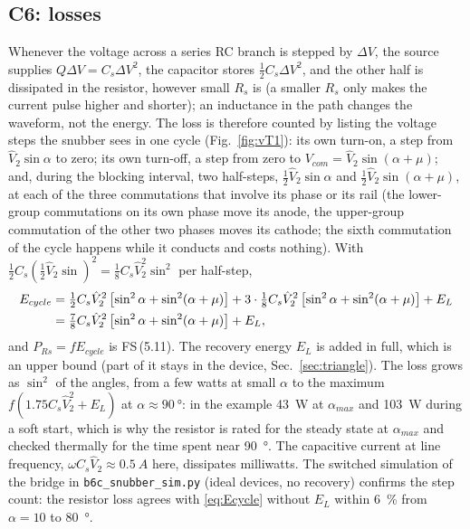 \documentclass[10pt,a4paper]{scrartcl}
\newcommand{\fs}[1]{\textsf{FS}\,(#1)}
\begin{document}
\subsection{C6: losses}\label{sec:C6}
Whenever the voltage across a series RC branch is stepped by $\Delta V$, the source supplies $Q\Delta V = C_s\Delta V^2$, the capacitor stores $\tfrac12C_s\Delta V^2$, and the other half is dissipated in the resistor, however small $R_s$ is (a smaller $R_s$ only makes the current pulse higher and shorter); an inductance in the path changes the waveform, not the energy. The loss is therefore counted by listing the voltage steps the snubber sees in one cycle (Fig.~\ref{fig:vT1}): its own turn-on, a step from $\hat V_2\sin\alpha$ to zero; its own turn-off, a step from zero to $V_{com} = \hat V_2\sin(\alpha+\mu)$; and, during the blocking interval, two half-steps, $\tfrac12\hat V_2\sin\alpha$ and $\tfrac12\hat V_2\sin(\alpha+\mu)$, at each of the three commutations that involve its phase or its rail (the lower-group commutations on its own phase move its anode, the upper-group commutation of the other two phases moves its cathode; the sixth commutation of the cycle happens while it conducts and costs nothing). With $\tfrac12C_s(\tfrac12\hat V_2\sin)^2 = \tfrac18C_s\hat V_2^2\sin^2$ per half-step,
\begin{align}
E_{cycle} &= \tfrac12C_s\hat V_2^2\left[\sin^2\alpha + \sin^2(\alpha+\mu)\right] + 3\cdot\tfrac18C_s\hat V_2^2\left[\sin^2\alpha + \sin^2(\alpha+\mu)\right] + E_L \notag\\
&= \tfrac78C_s\hat V_2^2\left[\sin^2\alpha + \sin^2(\alpha+\mu)\right] + E_L ,
\label{eq:Ecycle}
\end{align}
and $P_{Rs} = fE_{cycle}$ is \fs{5.11}. The recovery energy $E_L$ is added in full, which is an upper bound (part of it stays in the device, Sec.~\ref{sec:triangle}). The loss grows as $\sin^2$ of the angles, from a few watts at small $\alpha$ to the maximum $f(1.75C_s\hat V_2^2 + E_L)$ at $\alpha\approx\SI{90}{\degree}$: in the example \SI{43}{W} at $\alpha_{max}$ and \SI{103}{W} during a soft start, which is why the resistor is rated for the steady state at $\alpha_{max}$ and checked thermally for the time spent near \SI{90}{\degree}. The capacitive current at line frequency, $\omega C_s\hat V_2\approx\SI{0.5}{A}$ here, dissipates milliwatts. The switched simulation of the bridge in \texttt{b6c\_snubber\_sim.py} (ideal devices, no recovery) confirms the step count: the resistor loss agrees with \eqref{eq:Ecycle} without $E_L$ within \SI{6}{\percent} from $\alpha = 10$ to \SI{80}{\degree}.
\end{document}
